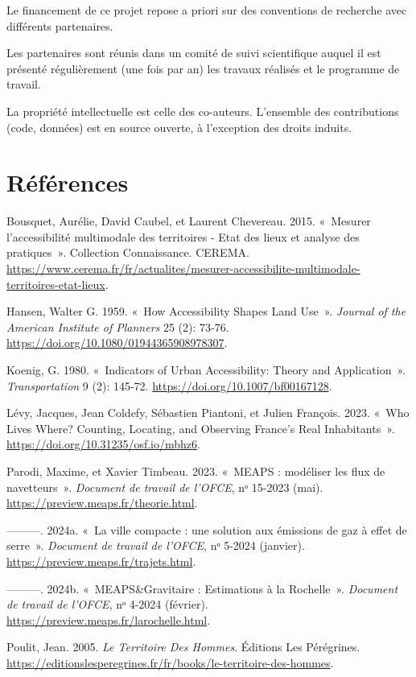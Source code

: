 \documentclass[
  french,
  9pt,
  a4paper,
  DIV=11,
  twoside=semi]{scrreprt}
\newlength{\cslhangindent}
\newenvironment{CSLReferences}[2] %
 {\begin{list}{}{%
  \setlength{\itemindent}{0pt}
  \setlength{\leftmargin}{0pt}
  \setlength{\parsep}{0pt}
  \ifodd #1
   \setlength{\leftmargin}{\cslhangindent}
   \setlength{\itemindent}{-1\cslhangindent}
  \fi
  \setlength{\itemsep}{#2\baselineskip}}}
 {\end{list}}
\begin{document}
Le financement de ce projet repose a priori sur des conventions de
recherche avec différents partenaires.

Les partenaires sont réunis dans un comité de suivi scientifique auquel
il est présenté régulièrement (une fois par an) les travaux réalisés et
le programme de travail.

La propriété intellectuelle est celle des co-auteurs. L'ensemble des
contributions (code, données) est en source ouverte, à l'exception des
droits induits.

\section*{Références}\label{ruxe9fuxe9rences}

\label{ref}

\label{refs}
\begin{CSLReferences}{1}{0}
Bousquet, Aurélie, David Caubel, et Laurent Chevereau. 2015. {«~Mesurer
l'accessibilité multimodale des territoires - Etat des lieux et analyse
des pratiques~»}. Collection Connaissance. CEREMA.
\url{https://www.cerema.fr/fr/actualites/mesurer-accessibilite-multimodale-territoires-etat-lieux}.

Hansen, Walter G. 1959. {«~How Accessibility Shapes Land Use~»}.
\emph{Journal of the American Institute of Planners} 25 (2): 73‑76.
\url{https://doi.org/10.1080/01944365908978307}.

Koenig, G. 1980. {«~Indicators of Urban Accessibility: Theory and
Application~»}. \emph{Transportation} 9 (2): 145‑72.
\url{https://doi.org/10.1007/bf00167128}.

Lévy, Jacques, Jean Coldefy, Sébastien Piantoni, et Julien François.
2023. {«~Who Lives Where? Counting, Locating, and Observing France{'}s
Real Inhabitants~»}. \url{https://doi.org/10.31235/osf.io/mbhz6}.

Parodi, Maxime, et Xavier Timbeau. 2023. {«~MEAPS : modéliser les flux
de navetteurs~»}. \emph{Document de travail de l'OFCE}, nᵒ 15-2023
(mai). \url{https://preview.meaps.fr/theorie.html}.

---------. 2024a. {«~La ville compacte : une solution aux émissions de
gaz à effet de serre~»}. \emph{Document de travail de l'OFCE}, nᵒ 5-2024
(janvier). \url{https://preview.meaps.fr/trajets.html}.

---------. 2024b. {«~MEAPS\&Gravitaire : Estimations à la Rochelle~»}.
\emph{Document de travail de l'OFCE}, nᵒ 4-2024 (février).
\url{https://preview.meaps.fr/larochelle.html}.

Poulit, Jean. 2005. \emph{Le Territoire Des Hommes}. Éditions Les
Pérégrines.
\url{https://editionslesperegrines.fr/fr/books/le-territoire-des-hommes}.

\end{CSLReferences}
\end{document}
